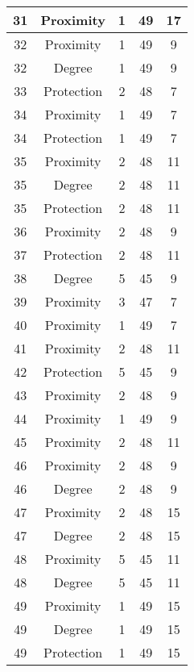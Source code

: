 \documentclass[results.tex]{subfiles}
\begin{document}
\begin{center}
\begin{tabular}{| c || c | c | c | c |}
    31 & Proximity & 1 & 49 & 17 \\ 
    \hline
    32 & Proximity & 1 & 49 & 9 \\ 
    \hline
    32 & Degree & 1 & 49 & 9 \\ 
    \hline
    33 & Protection & 2 & 48 & 7 \\ 
    \hline
    34 & Proximity & 1 & 49 & 7 \\ 
    \hline
    34 & Protection & 1 & 49 & 7 \\ 
    \hline
    35 & Proximity & 2 & 48 & 11 \\ 
    \hline
    35 & Degree & 2 & 48 & 11 \\ 
    \hline
    35 & Protection & 2 & 48 & 11 \\ 
    \hline
    36 & Proximity & 2 & 48 & 9 \\ 
    \hline
    37 & Protection & 2 & 48 & 11 \\ 
    \hline
    38 & Degree & 5 & 45 & 9 \\ 
    \hline
    39 & Proximity & 3 & 47 & 7 \\ 
    \hline
    40 & Proximity & 1 & 49 & 7 \\ 
    \hline
    41 & Proximity & 2 & 48 & 11 \\ 
    \hline
    42 & Protection & 5 & 45 & 9 \\ 
    \hline
    43 & Proximity & 2 & 48 & 9 \\ 
    \hline
    44 & Proximity & 1 & 49 & 9 \\ 
    \hline
    45 & Proximity & 2 & 48 & 11 \\ 
    \hline
    46 & Proximity & 2 & 48 & 9 \\ 
    \hline
    46 & Degree & 2 & 48 & 9 \\ 
    \hline
    47 & Proximity & 2 & 48 & 15 \\ 
    \hline
    47 & Degree & 2 & 48 & 15 \\ 
    \hline
    48 & Proximity & 5 & 45 & 11 \\ 
    \hline
    48 & Degree & 5 & 45 & 11 \\ 
    \hline
    49 & Proximity & 1 & 49 & 15 \\ 
    \hline
    49 & Degree & 1 & 49 & 15 \\ 
    \hline
    49 & Protection & 1 & 49 & 15 \\ 
    \hline   \end{tabular}
\end{center}
\end{document}
